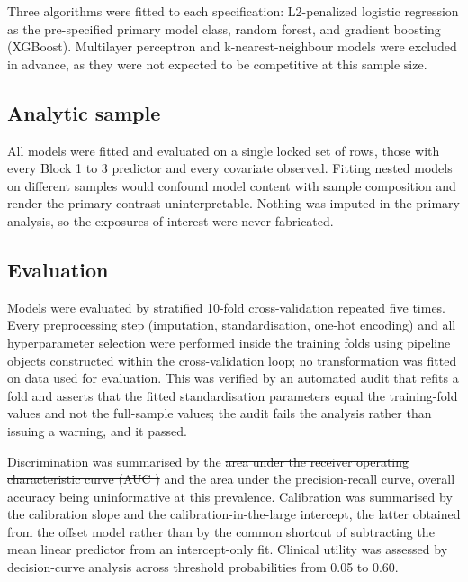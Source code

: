 \documentclass[12pt]{article}
\providecommand{\DIFaddtex}[1]{{\protect\color{blue}\uwave{#1}}} %
\providecommand{\DIFdeltex}[1]{{\protect\color{red}\sout{#1}}} %
\providecommand{\DIFaddbegin}{} %
\providecommand{\DIFaddend}{} %
\providecommand{\DIFdelbegin}{} %
\providecommand{\DIFdelend}{} %
\providecommand{\DIFadd}[1]{\texorpdfstring{\DIFaddtex{#1}}{#1}} %
\providecommand{\DIFdel}[1]{\texorpdfstring{\DIFdeltex{#1}}{}} %
\providecommand{\DIFscaledelfig}{0.5}
\newlength{\DIFdelgraphicswidth} %
\newlength{\DIFdelgraphicsheight} %
\providecommand{\DIFaddincludegraphics}[2][]{{\color{blue}\fbox{\DIFOincludegraphics[#1]{#2}}}} %
\providecommand{\DIFdelincludegraphics}[2][]{%
\sbox{\DIFdelgraphicsbox}{\DIFOincludegraphics[#1]{#2}}%
\settoboxwidth{\DIFdelgraphicswidth}{\DIFdelgraphicsbox} %
\settoboxtotalheight{\DIFdelgraphicsheight}{\DIFdelgraphicsbox} %
\scalebox{\DIFscaledelfig}{%
\parbox[b]{\DIFdelgraphicswidth}{\usebox{\DIFdelgraphicsbox}\\[-\baselineskip] \rule{\DIFdelgraphicswidth}{0em}}\llap{\resizebox{\DIFdelgraphicswidth}{\DIFdelgraphicsheight}{%
\setlength{\unitlength}{\DIFdelgraphicswidth}%
\begin{picture}(1,1)%
\thicklines\linethickness{2pt} %
{\color[rgb]{1,0,0}\put(0,0){\framebox(1,1){}}}%
{\color[rgb]{1,0,0}\put(0,0){\line( 1,1){1}}}%
{\color[rgb]{1,0,0}\put(0,1){\line(1,-1){1}}}%
\end{picture}%
}\hspace*{3pt}}} %
} %
\DeclareRobustCommand{\DIFaddbegin}{\DIFOaddbegin \let\includegraphics\DIFaddincludegraphics} %
\DeclareRobustCommand{\DIFaddend}{\DIFOaddend \let\includegraphics\DIFOincludegraphics} %
\DeclareRobustCommand{\DIFdelbegin}{\DIFOdelbegin \let\includegraphics\DIFdelincludegraphics} %
\DeclareRobustCommand{\DIFdelend}{\DIFOaddend \let\includegraphics\DIFOincludegraphics} %
\begin{document}
Three algorithms were fitted to each specification: L2-penalized logistic regression as the pre-specified primary model class, random forest, and gradient boosting (XGBoost). Multilayer perceptron and k-nearest-neighbour models were excluded in advance, as they were not expected to be competitive at this sample size.

\subsection*{Analytic sample}

All models were fitted and evaluated on a single locked set of rows, those with every Block 1 to 3 predictor and every covariate observed. Fitting nested models on different samples would confound model content with sample composition and render the primary contrast uninterpretable. Nothing was imputed in the primary analysis, so the exposures of interest were never fabricated.

\subsection*{Evaluation}

Models were evaluated by stratified 10-fold cross-validation repeated five times. Every preprocessing step (imputation, standardisation, one-hot encoding) and all hyperparameter selection were performed inside the training folds using pipeline objects constructed within the cross-validation loop; no transformation was fitted on data used for evaluation. This was verified by an automated audit that refits a fold and asserts that the fitted standardisation parameters equal the training-fold values and not the full-sample values; the audit fails the analysis rather than issuing a warning, and it passed.

Discrimination was summarised by the \DIFdelbegin \DIFdel{area under the receiver operating characteristic curve (AUC ) }\DIFdelend \DIFaddbegin \DIFadd{AUC }\DIFaddend and the area under the precision-recall curve, overall accuracy being uninformative at this prevalence. Calibration was summarised by the calibration slope and the calibration-in-the-large intercept, the latter obtained from the offset model rather than by the common shortcut of subtracting the mean linear predictor from an intercept-only fit. Clinical utility was assessed by decision-curve analysis across threshold probabilities from 0.05 to 0.60.
\end{document}

